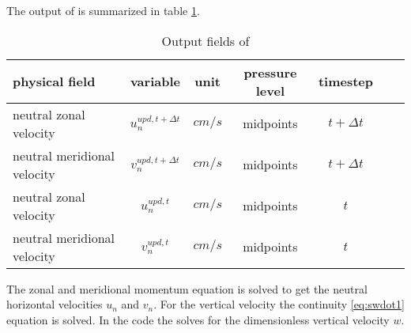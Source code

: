 %
The output of  is summarized in table
\ref{tab:output_duv}.
%
\begin{table}[tb]
\begin{tabular}{|p{3.5cm} ||c|c|c|c|c|c|} \hline
physical field               & variable        & unit&pressure
level& timestep \\ \hline \hline
neutral zonal velocity     &       {$u_n^{upd,t+\Delta t}$}     & $cm/s$   & midpoints  & $t+\Delta t$ \\
neutral meridional velocity&       {$v_n^{upd,t+\Delta t}$}     & $cm/s$   & midpoints  & $t+\Delta t$\\
neutral zonal velocity     &       {$u_n^{upd,t}$}     & $cm/s$   & midpoints  & $t$\\
neutral meridional velocity&       {$v_n^{upd,t}$}     & $cm/s$
&midpoints  & $t$
\\ \hline \hline
\end{tabular}
\caption{Output fields of }
\label{tab:output_duv}
\end{table}
%
The zonal and meridional momentum equation is solved to get the
neutral horizontal velocities $u_n$ and $v_n$. For the vertical
velocity the continuity \ref{eq:swdot1} equation is solved. In the code the
 solves for the dimensionless vertical
velocity $w$. \\

